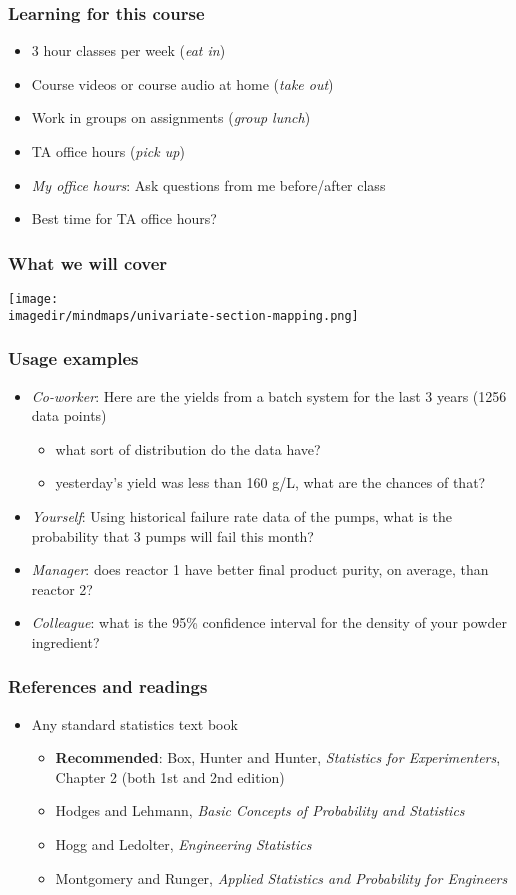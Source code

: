 \begin{frame}\frametitle{Learning for this course}
	\begin{itemize}
		\item 3 hour classes per week (\emph{eat in})
		\item Course videos or course audio at home (\emph{take out})
		\item Work in groups on assignments (\emph{group lunch})
		\item TA office hours (\emph{pick up})
		\item \emph{My office hours}: Ask questions from me before/after class
		\item Best time for TA office hours?
	\end{itemize}
\end{frame}

\begin{frame}\frametitle{What we will cover}
	\texttt{[image: \\imagedir/mindmaps/univariate-section-mapping.png]}
\end{frame}

\begin{frame}\frametitle{Usage examples}
	\begin{itemize}
		\item \emph{Co-worker}: Here are the yields from a batch system for the last 3 years (1256 data points)
		\begin{itemize}
			\item what sort of distribution do the data have?
			\item yesterday's yield was less than 160 g/L, what are the chances of that?
		\end{itemize}
		\item \emph{Yourself}: Using historical failure rate data of the pumps, what is the probability that 3 pumps will fail this month?
		\item \emph{Manager}: does reactor 1 have better final product purity, on average, than reactor 2?
		\item \emph{Colleague}: what is the 95\% confidence interval for the density of your powder ingredient?
	\end{itemize}
\end{frame}

\begin{frame}\frametitle{References and readings}
	\begin{itemize}
		\item Any standard statistics text book
		\begin{itemize}
			\item \textbf{Recommended}: Box, Hunter and Hunter, \emph{Statistics for Experimenters}, Chapter 2 (both 1st and 2nd edition)
			\item Hodges and Lehmann, \emph{Basic Concepts of Probability and Statistics}
			\item Hogg and Ledolter, \emph{Engineering Statistics}
			\item Montgomery and Runger, \emph{Applied Statistics and Probability for Engineers}
		\end{itemize}
	\end{itemize}
\end{frame}

